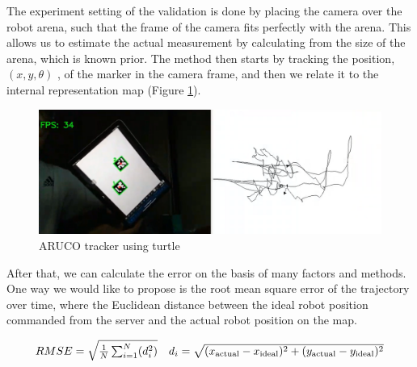 The experiment setting of the validation is done by placing the camera over the robot arena, such that the frame of the camera fits perfectly with the arena. This allows us to estimate the actual measurement by calculating from the size of the arena, which is known prior. The method then starts by tracking the position,$(x, y, \theta)$  , of the marker in the camera frame, and then we relate it to the internal representation map (Figure \ref{fig:aruco-tracker}). 

\begin{figure}[H]
    \centering
    \includegraphics[width=0.9\linewidth]{assets/images/odometry/arcuo_tracker.png}
    \caption{ARUCO tracker using turtle}
    \label{fig:aruco-tracker}
\end{figure}

After that, we can calculate the error on the basis of many factors and methods. One way we would like to propose is the root mean square error of the trajectory over time, where the Euclidean distance between the ideal robot position commanded from the server and the actual robot position on the map.

\[
\begin{array}{c c}
RMSE = \sqrt{\frac{1}{N} \sum_{i=1}^{N} (d_i^2)} & d_i = \sqrt{(x_{\text{actual}} - x_{\text{ideal}})^2 + (y_{\text{actual}} - y_{\text{ideal}})^2}
\end{array}
\]
